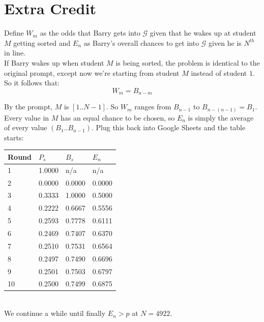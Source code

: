 \documentclass[10pt, letterpaper]{article}
\begin{document}
\section*{Extra Credit}

Define $W_m$ as the odds that Barry gets into $\mathcal{G}$ given that he wakes up at student $M$ getting sorted
and $E_n$ as Barry's overall chances to get into $\mathcal{G}$ given he is $N^{th}$ in line.\\

If Barry wakes up when student $M$ is being sorted, the problem is identical to the original prompt, except now we're starting from student $M$ instead of student $1$.
So it follows that:
\begin{equation}
    W_m = B_{n-m}
\end{equation}

By the prompt, $M$ is $[1..N-1]$. So $W_m$ ranges from $B_{n-1}$ to $B_{n-(n-1)} = B_1$.\\

Every value in $M$ has an equal chance to be chosen, so $E_n$ is simply the average of every value $(B_1..B_{n-1})$. Plug this back into Google Sheets and the table starts:\\

\begin{tabular}{l | l | l | l }
    Round   & $P_s$     & $B_s$     & $E_n$     \\ \hline
    1       & 1.0000    & n/a       & n/a       \\
    2       & 0.0000    & 0.0000    & 0.0000    \\
    3       & 0.3333    & 1.0000    & 0.5000    \\
    4       & 0.2222    & 0.6667    & 0.5556    \\
    5       & 0.2593    & 0.7778    & 0.6111    \\
    6       & 0.2469    & 0.7407    & 0.6370    \\
    7       & 0.2510    & 0.7531    & 0.6564    \\
    8       & 0.2497    & 0.7490    & 0.6696    \\
    9       & 0.2501    & 0.7503    & 0.6797    \\
    10      & 0.2500    & 0.7499    & 0.6875    \\
\end{tabular}\\

We continue a while until finally $E_n > p$ at $N = 4922$.
\end{document}
